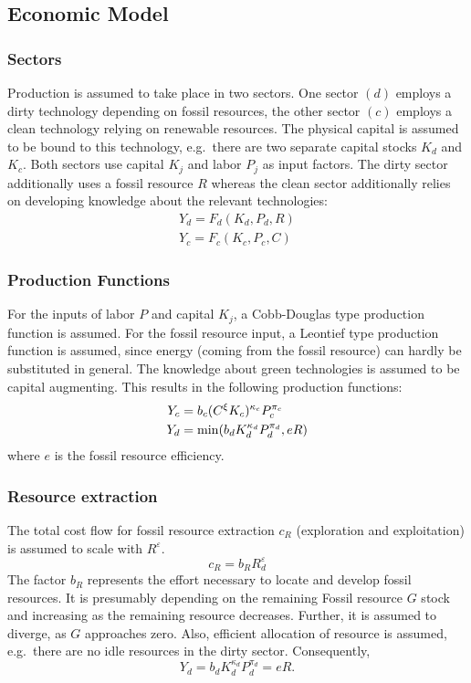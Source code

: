 \subsection{Economic Model}


\subsubsection{Sectors}

Production is assumed to take place in two sectors. One sector $(d)$ employs a dirty technology depending on fossil resources, the other sector $(c)$ employs a clean technology relying on renewable resources. The physical capital is assumed to be bound to this technology, e.g.\ there are two separate capital stocks $K_d$ and $K_c$. Both sectors use capital $K_j$ and labor $P_j$ as input factors. The dirty sector additionally uses a fossil resource $R$ whereas the clean sector additionally relies on developing knowledge about the relevant technologies:
\begin{align}
	Y_d = F_d(K_d,P_d,R) \\
	Y_c = F_c(K_c,P_c,C)
	\label{eq:production}
\end{align}

\subsubsection{Production Functions}
For the inputs of labor $P$ and capital $K_j$, a Cobb-Douglas type production function is assumed. For the fossil resource input, a Leontief type production function is assumed, since energy (coming from the fossil resource) can hardly be substituted in general. The knowledge about green technologies is assumed to be capital augmenting. This results in the following production functions:
\begin{align}
	Y_c &= b_c (C^\xi K_c)^{\kappa_c} P_c^{\pi_c} \\
	Y_d &= {\rm min}(b_d K_d^{\kappa_d} P_d ^{\pi_d}, e R)
\end{align}
where $e$ is the fossil resource efficiency.

\subsubsection{Resource extraction}
The total cost flow for fossil resource extraction $c_R$ (exploration and exploitation) is assumed to scale with $R^{\varepsilon}$.
\begin{equation}
	c_R = b_R R_d^{\varepsilon}
	\label{resource_extraction_cost}
\end{equation}
The factor $b_R$ represents the effort necessary to locate and develop fossil resources. It is presumably depending on the remaining Fossil resource $G$ stock and increasing as the remaining resource decreases. Further, it is assumed to diverge, as $G$ approaches zero. Also, efficient allocation of resource is assumed, e.g.\ there are no idle resources in the dirty sector. Consequently,
\begin{equation}
	Y_d = b_d K_d^{\kappa_d} P_d^{\pi_d} = e R.
	\label{efficient_resource_extraction}
\end{equation}
